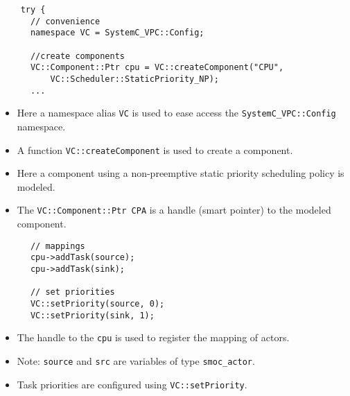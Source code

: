 \begin{frame}[fragile=singleslide]
\begin{lstlisting}
    try {
      // convenience
      namespace VC = SystemC_VPC::Config;

      //create components
      VC::Component::Ptr cpu = VC::createComponent("CPU",
          VC::Scheduler::StaticPriority_NP);
      ...
\end{lstlisting}
\begin{itemize}
\item Here a namespace alias \lstinline!VC! is used to ease access the \lstinline!SystemC_VPC::Config! namespace.
\item A function \lstinline!VC::createComponent! is used to create a component.
\item Here a component using a non-preemptive static priority scheduling policy is modeled.
\item The \lstinline!VC::Component::Ptr CPA! is a handle (smart pointer) to the modeled component.
\end{itemize}
\end{frame}


\begin{frame}[fragile=singleslide]
\begin{lstlisting}
      // mappings
      cpu->addTask(source);
      cpu->addTask(sink);

      // set priorities
      VC::setPriority(source, 0);
      VC::setPriority(sink, 1);
\end{lstlisting}
\begin{itemize}
\item The handle to the \lstinline!cpu! is used to register the mapping of actors.
\item Note: \lstinline!source! and \lstinline!src! are variables of type \lstinline!smoc_actor!.
\item Task priorities are configured using \lstinline!VC::setPriority!.
\end{itemize}
\end{frame}


